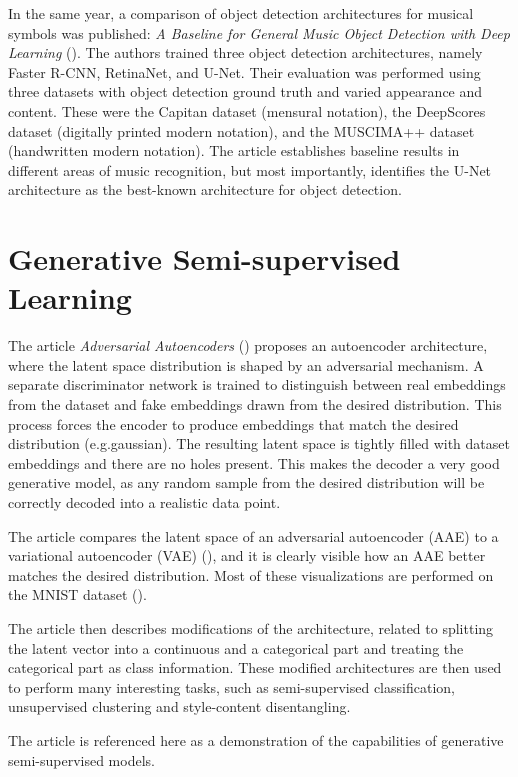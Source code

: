 In the same year, a comparison of object detection architectures for musical symbols was published: \emph{A Baseline for General Music Object Detection with Deep Learning} (\cite{PachaBaseline}). The authors trained three object detection architectures, namely Faster R-CNN, RetinaNet, and U-Net. Their evaluation was performed using three datasets with object detection ground truth and varied appearance and content. These were the Capitan dataset (mensural notation), the DeepScores dataset (digitally printed modern notation), and the MUSCIMA++ dataset (handwritten modern notation). The article establishes baseline results in different areas of music recognition, but most importantly, identifies the U-Net architecture as the best-known architecture for object detection.


\section{Generative Semi-supervised Learning}

The article \emph{Adversarial Autoencoders} (\cite{AdversarialAutoencoders}) proposes an autoencoder architecture, where the latent space distribution is shaped by an adversarial mechanism. A separate discriminator network is trained to distinguish between real embeddings from the dataset and fake embeddings drawn from the desired distribution. This process forces the encoder to produce embeddings that match the desired distribution (e.g.\@ gaussian). The resulting latent space is tightly filled with dataset embeddings and there are no holes present. This makes the decoder a very good generative model, as any random sample from the desired distribution will be correctly decoded into a realistic data point.

The article compares the latent space of an adversarial autoencoder (AAE) to a variational autoencoder (VAE) (\cite{VariationalAutoencoder}), and it is clearly visible how an AAE better matches the desired distribution. Most of these visualizations are performed on the MNIST dataset (\cite{Mnist}).

The article then describes modifications of the architecture, related to splitting the latent vector into a continuous and a categorical part and treating the categorical part as class information. These modified architectures are then used to perform many interesting tasks, such as semi-supervised classification, unsupervised clustering and style-content disentangling.

The article is referenced here as a demonstration of the capabilities of generative semi-supervised models.

